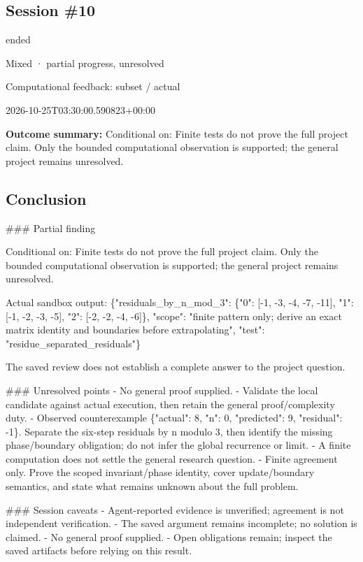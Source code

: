 \documentclass[11pt]{article}
\begin{document}
\subsection{Session \#10}
\begin{description}[style=nextline,font=\normalfont\bfseries,leftmargin=0pt,labelsep=0pt]
\item[Execution status] ended
\item[Outcome] Mixed · partial progress, unresolved
\item[Strategy] Computational feedback: subset / actual
\item[Started] 2026-10-25T03:30:00.590823+00:00
\end{description}
\textbf{Outcome summary:} Conditional on: Finite tests do not prove the full project claim. Only the bounded computational observation is supported; the general project remains unresolved.\par
\subsection{Conclusion}
\#\#\# Partial finding

Conditional on: Finite tests do not prove the full project claim. Only the bounded computational observation is supported; the general project remains unresolved.

Actual sandbox output: \{"residuals\_by\_n\_mod\_3": \{"0": [-1, -3, -4, -7, -11], "1": [-1, -2, -3, -5], "2": [-2, -2, -4, -6]\}, "scope": "finite pattern only; derive an exact matrix identity and boundaries before extrapolating", "test": "residue\_separated\_residuals"\}

The saved review does not establish a complete answer to the project question.

\#\#\# Unresolved points
- No general proof supplied.
- Validate the local candidate against actual execution, then retain the general proof/complexity duty.
- Observed counterexample \{"actual": 8, "n": 0, "predicted": 9, "residual": -1\}. Separate the six-step residuals by n modulo 3, then identify the missing phase/boundary obligation; do not infer the global recurrence or limit.
- A finite computation does not settle the general research question.
- Finite agreement only. Prove the scoped invariant/phase identity, cover update/boundary semantics, and state what remains unknown about the full problem.

\#\#\# Session caveats
- Agent-reported evidence is unverified; agreement is not independent verification.
- The saved argument remains incomplete; no solution is claimed.
- No general proof supplied.
- Open obligations remain; inspect the saved artifacts before relying on this result.
\end{document}

